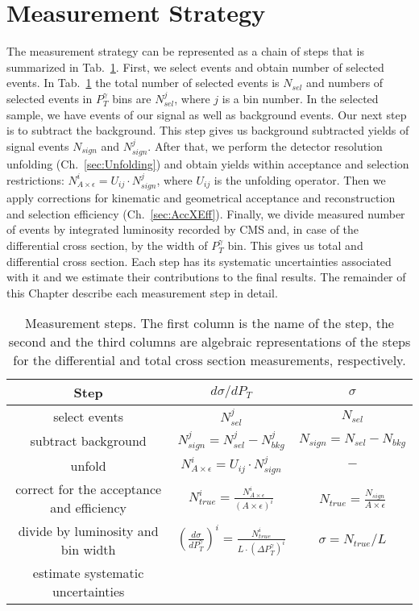 \section{Measurement Strategy}
\label{sec:AN_WgMeasStrategy}

The measurement strategy can be represented as a chain of steps that is summarized in Tab.~\ref{tab:analysisOutline}. First, we select events and obtain number of selected events. In Tab.~\ref{tab:analysisOutline} the total number of selected events is $N_{sel}$ and numbers of selected events in $P_T^{\gamma}$ bins are $N_{sel}^j$, where $j$ is a bin number. In the selected sample, we have events of our signal as well as background events. Our next step is to subtract the background. This step gives us background subtracted yields of signal events $N_{sign}$ and $N_{sign}^j$. After that, we perform the detector resolution unfolding (Ch.~\ref{sec:Unfolding}) and obtain yields within acceptance and selection restrictions: $N_{A\times\epsilon}^i = U_{ij} \cdot N_{sign}^j$, where $U_{ij}$ is the unfolding operator. Then we apply corrections for kinematic and geometrical acceptance and reconstruction and selection efficiency (Ch.~\ref{sec:AccXEff}). Finally, we divide measured number of events by integrated luminosity recorded by CMS and, in case of the differential cross section, by the width of $P_T^{\gamma}$ bin. This gives us total and differential cross section. Each step has its systematic uncertainties associated with it and we estimate their contributions to the final results. The remainder of this Chapter describe each measurement step in detail.

\begin{table}[h]
  \small
  \begin{center}
  \caption{Measurement steps. The first column is the name of the step, the second and the third columns are algebraic representations of the steps for the differential and total cross section measurements, respectively. }
  \begin{tabular}{|c|c|c|}
    \hline
    Step & $d\sigma/dP_{T}$ & $\sigma$ \\ \hline
    select events & $N_{sel}^j$ &    $N_{sel}$       \\ \hline
    subtract background & $N_{sign}^j = N_{sel}^j - N_{bkg}^j$ &    $N_{sign}=N_{sel}-N_{bkg}$       \\ \hline
    unfold   & $N_{A\times\epsilon}^i = U_{ij} \cdot N_{sign}^j$ &    $-$       \\ \hline
    correct for the acceptance and efficiency & $N_{true}^i = \frac{N_{A\times\epsilon}^i}{(A \times\epsilon)^i}$ &  $N_{true}=\frac{N_{sign}}{A\times\epsilon}$       \\ \hline
    divide by luminosity and bin width & $ \left( \frac{d\sigma}{dP_{T}^\gamma} \right) ^i = \frac{N_{true}^i}{L \cdot (\Delta P_T^\gamma)^i}$  &  $\sigma = N_{true}/L$       \\ \hline
    estimate systematic uncertainties &  &         \\ \hline
  \end{tabular}
  \label{tab:analysisOutline}
  \end{center}
\end{table}

